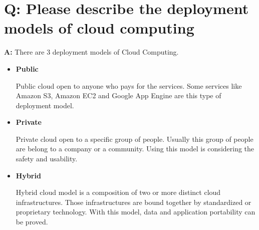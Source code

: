 \documentclass[a4paper]{article}
\begin{document}
\vspace{5mm} 

\section{ Q: Please describe the deployment models of cloud computing}

\hspace{1cm}\textbf{A:} There are 3 deployment models of Cloud Computing.
\begin{itemize}
\item \textbf{Public}

Public cloud open to anyone who pays for the services. Some services like Amazon S3, Amazon EC2 and Google App Engine are this type of deployment model.

\vspace{2mm} 

\item \textbf{Private}

Private cloud open to a specific group of people. Usually this group of people are belong to a company or a community. Using this model is considering the safety and usability.

\vspace{2mm} 

\item \textbf{Hybrid}

Hybrid cloud model is a composition of two or more distinct cloud infrastructures. Those infrastructures are bound together by standardized or proprietary technology. With this model, data and application portability can be proved.

\vspace{2mm} 

\end{itemize}
\end{document}
